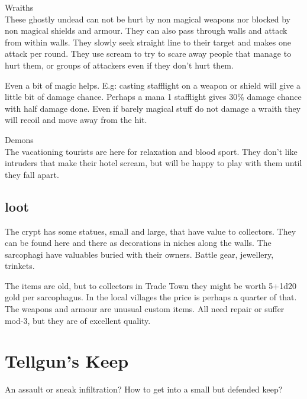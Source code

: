 \noindent Wraiths\\
These ghostly undead can not be hurt by non magical weapons nor blocked by non magical shields and armour. They can also pass through walls and attack from within walls. They slowly seek straight line to their target and makes one attack per round. They use scream to try to scare away people that manage to hurt them, or groups of attackers even if they don't hurt them.

Even a bit of magic helps. E.g: casting stafflight on a weapon or shield will give a little bit of damage chance. Perhaps a mana 1 stafflight gives 30\% damage chance with half damage done.
Even if barely magical stuff do not damage a wraith they will recoil and move away from the hit.


\noindent Demons\\
The vacationing tourists are here for relaxation and blood sport. They don't like intruders that make their hotel scream, but will be happy to play with them until they fall apart.


\subsection*{loot}
The crypt has some statues, small and large, that have value to collectors. They can be found here and there as decorations in niches along the walls. The sarcophagi have valuables buried with their owners. Battle gear, jewellery, trinkets.

The items are old, but to collectors in Trade Town they might be worth 5+1d20 gold per sarcophagus. In the local villages the price is perhaps a quarter of that. The weapons and armour are unusual custom items. All need repair or suffer mod-3, but they are of excellent quality.










\section*{Tellgun's Keep}
An assault or sneak infiltration? How to get into a small but defended keep?


